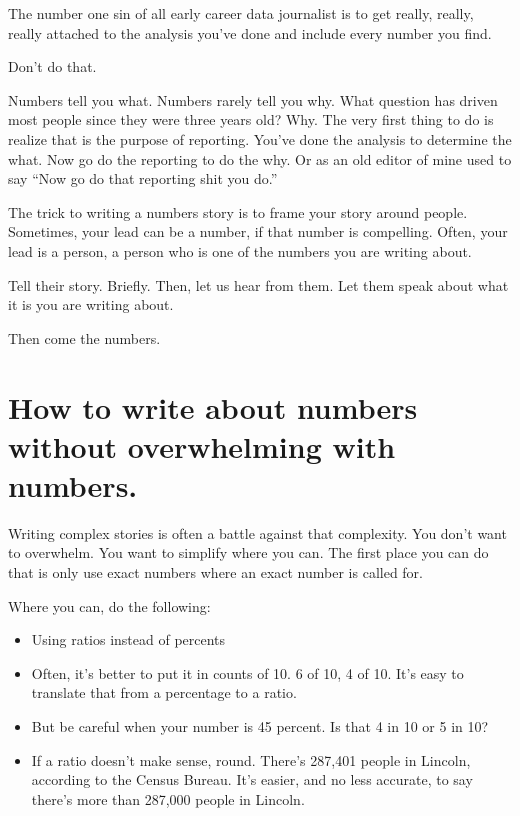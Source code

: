 \documentclass[]{book}
\providecommand{\tightlist}{%
  \setlength{\itemsep}{0pt}\setlength{\parskip}{0pt}}
\begin{document}
The number one sin of all early career data journalist is to get really, really, really attached to the analysis you've done and include every number you find.

Don't do that.

Numbers tell you what. Numbers rarely tell you why. What question has driven most people since they were three years old? Why. The very first thing to do is realize that is the purpose of reporting. You've done the analysis to determine the what. Now go do the reporting to do the why. Or as an old editor of mine used to say ``Now go do that reporting shit you do.''

The trick to writing a numbers story is to frame your story around people. Sometimes, your lead can be a number, if that number is compelling. Often, your lead is a person, a person who is one of the numbers you are writing about.

Tell their story. Briefly. Then, let us hear from them. Let them speak about what it is you are writing about.

Then come the numbers.

\hypertarget{how-to-write-about-numbers-without-overwhelming-with-numbers.}{%
\section{How to write about numbers without overwhelming with numbers.}\label{how-to-write-about-numbers-without-overwhelming-with-numbers.}}

Writing complex stories is often a battle against that complexity. You don't want to overwhelm. You want to simplify where you can. The first place you can do that is only use exact numbers where an exact number is called for.

Where you can, do the following:

\begin{itemize}
\tightlist
\item
  Using ratios instead of percents
\item
  Often, it's better to put it in counts of 10. 6 of 10, 4 of 10. It's easy to translate that from a percentage to a ratio.
\item
  But be careful when your number is 45 percent. Is that 4 in 10 or 5 in 10?
\item
  If a ratio doesn't make sense, round. There's 287,401 people in Lincoln, according to the Census Bureau. It's easier, and no less accurate, to say there's more than 287,000 people in Lincoln.
\end{itemize}
\end{document}
